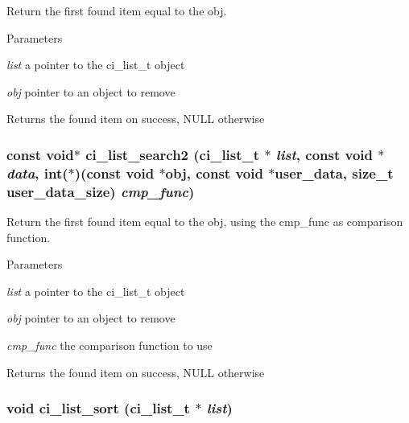 Return the first found item equal to the obj. 
\begin{DoxyParams}{Parameters}
\item[{\em list}]a pointer to the ci\_\-list\_\-t object \item[{\em obj}]pointer to an object to remove \end{DoxyParams}
\begin{DoxyReturn}{Returns}
the found item on success, NULL otherwise 
\end{DoxyReturn}
\hypertarget{group__LISTS_ga80c99d3e99b256414bb53b14108168a0}{
\subsubsection[{ci\_\-list\_\-search2}]{\setlength{\rightskip}{0pt plus 5cm}const void$\ast$ ci\_\-list\_\-search2 ({\bf ci\_\-list\_\-t} $\ast$ {\em list}, \/  const void $\ast$ {\em data}, \/  int($\ast$)(const void $\ast$obj, const void $\ast$user\_\-data, size\_\-t user\_\-data\_\-size) {\em cmp\_\-func})}}
\label{group__LISTS_ga80c99d3e99b256414bb53b14108168a0}


Return the first found item equal to the obj, using the cmp\_\-func as comparison function. 
\begin{DoxyParams}{Parameters}
\item[{\em list}]a pointer to the ci\_\-list\_\-t object \item[{\em obj}]pointer to an object to remove \item[{\em cmp\_\-func}]the comparison function to use \end{DoxyParams}
\begin{DoxyReturn}{Returns}
the found item on success, NULL otherwise 
\end{DoxyReturn}
\hypertarget{group__LISTS_ga5253cbf795ff0b07b8ad8aad68c6880e}{
\subsubsection[{ci\_\-list\_\-sort}]{\setlength{\rightskip}{0pt plus 5cm}void ci\_\-list\_\-sort ({\bf ci\_\-list\_\-t} $\ast$ {\em list})}}
\label{group__LISTS_ga5253cbf795ff0b07b8ad8aad68c6880e}


